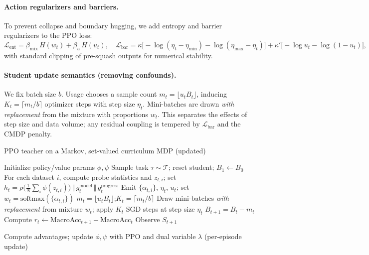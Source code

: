 \documentclass[11pt]{article}
\newcommand{\MacroAcc}{\mathrm{MacroAcc}}
\newcommand{\1}{\mathbf{1}}
\begin{document}
\paragraph{Action regularizers and barriers.}
To prevent collapse and boundary hugging, we add entropy and barrier regularizers to the PPO loss:
\(
\mathcal{L}_{\text{ent}}= \beta_{\text{mix}}\, H(w_t) + \beta_u\, H(u_t),\quad
\mathcal{L}_{\text{bar}}= \kappa\big[-\log(\eta_t-\eta_{\min})-\log(\eta_{\max}-\eta_t)\big] + \kappa'\big[-\log u_t - \log (1-u_t)\big],
\)
with standard clipping of pre-squash outputs for numerical stability.

\paragraph{Student update semantics (removing confounds).}
We fix batch size $b$.
Usage chooses a sample count $m_t=\lfloor u_t B_t\rfloor$, inducing $K_t=\lceil m_t/b\rceil$ optimizer steps with step size $\eta_t$.
Mini-batches are drawn \emph{with replacement} from the mixture with proportions $w_t$.
This separates the effects of step size and data volume; any residual coupling is tempered by $\mathcal{L}_{\text{bar}}$ and the CMDP penalty.

\begin{algorithm}[H]
\caption{PPO teacher on a Markov, set-valued curriculum MDP (updated)}
\label{alg:ppo}
\begin{algorithmic}[1]
\State Initialize policy/value params $\phi,\psi$
    \State Sample task $\tau\sim\mathcal{T}$; reset student; $B_1\leftarrow B_0$
      \State {}
      \State For each dataset $i$, compute probe statistics and $z_{t,i}$; set $h_t=\rho\!\big(\tfrac{1}{N}\sum_i \phi(z_{t,i})\big)\,\Vert\,g^{\text{model}}_t\,\Vert\,g^{\text{progress}}_t$
      \State Emit $\{\alpha_{t,i}\}$, $\eta_t$, $u_t$; set $w_t=\mathrm{softmax}(\{\alpha_{t,i}\})$
      \State $m_t=\lfloor u_t B_t\rfloor$;\quad $K_t=\lceil m_t/b\rceil$
      \State Draw mini-batches \emph{with replacement} from mixture $w_t$; apply $K_t$ SGD steps at step size $\eta_t$
      \State $B_{t+1}=B_t-m_t$
      \State Compute $r_t \leftarrow \MacroAcc_{t+1}-\MacroAcc_t$
      \State Observe $S_{t+1}$

    \EndFor
  \EndFor
  \State Compute advantages; update $\phi,\psi$ with PPO and dual variable $\lambda$ (per-episode update)
\EndFor
\end{algorithmic}
\end{algorithm}
\end{document}
